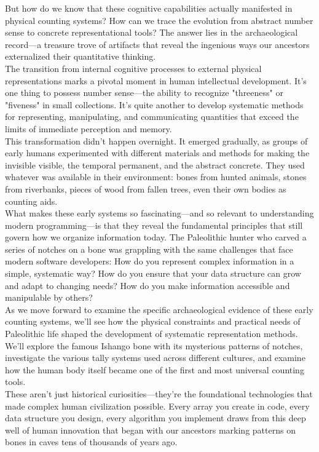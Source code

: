 But how do we know that these cognitive capabilities actually manifested in physical counting systems? How can we trace the evolution from abstract number sense to concrete representational tools? The answer lies in the archaeological record—a treasure trove of artifacts that reveal the ingenious ways our ancestors externalized their quantitative thinking.\\
The transition from internal cognitive processes to external physical representations marks a pivotal moment in human intellectual development. It's one thing to possess number sense—the ability to recognize "threeness" or "fiveness" in small collections. It's quite another to develop systematic methods for representing, manipulating, and communicating quantities that exceed the limits of immediate perception and memory.\\
This transformation didn't happen overnight. It emerged gradually, as groups of early humans experimented with different materials and methods for making the invisible visible, the temporal permanent, and the abstract concrete. They used whatever was available in their environment: bones from hunted animals, stones from riverbanks, pieces of wood from fallen trees, even their own bodies as counting aids.\\
What makes these early systems so fascinating—and so relevant to understanding modern programming—is that they reveal the fundamental principles that still govern how we organize information today. The Paleolithic hunter who carved a series of notches on a bone was grappling with the same challenges that face modern software developers: How do you represent complex information in a simple, systematic way? How do you ensure that your data structure can grow and adapt to changing needs? How do you make information accessible and manipulable by others?\\
As we move forward to examine the specific archaeological evidence of these early counting systems, we'll see how the physical constraints and practical needs of Paleolithic life shaped the development of systematic representation methods. We'll explore the famous Ishango bone with its mysterious patterns of notches, investigate the various tally systems used across different cultures, and examine how the human body itself became one of the first and most universal counting tools.\\
These aren't just historical curiosities—they're the foundational technologies that made complex human civilization possible. Every array you create in code, every data structure you design, every algorithm you implement draws from this deep well of human innovation that began with our ancestors marking patterns on bones in caves tens of thousands of years ago.\newpage

